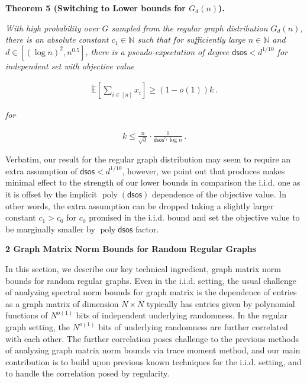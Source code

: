 \documentclass[10pt,a4paper]{article}
\begin{document}


\par\medskip\noindent\textbf{
\textbf{Theorem 5}\textbf{ }(Switching to Lower bounds for $G_{d}(n)$)\textbf{.}
}\par



\emph{With high probability over $G$ sampled from the regular graph distribution $G_{d}(n)$, there is an absolute constant $c_{1}\in\mathbb{N}$ such that for sufficiently large $n\in\mathbb{N}$ and $d\in[(\log n)^{2},n^{0.5}]$, there is a pseudo-expectation of degree $\mathsf{dsos}<d^{1/10}$ for independent set with objective value}\par


\[\begin{gathered}
\widetilde{\mathbb{E}}[\sum_{i\in[n]}x_{i}]\geq(1-o(1))k\,.
\end{gathered}\]


\emph{for}\par


\[\begin{gathered}
k\leq\frac{n}{\sqrt{d}}\cdot\frac{1}{\mathsf{dsos}^{c_{1}}\log n}\,.
\end{gathered}\]






Verbatim, our result for the regular graph distribution may seem to require an extra assumption of $\mathsf{dsos}<d^{1/10}$, however, we point out that produces makes minimal effect to the strength of our lower bounds in comparison the i.i.d. one as it is offset by the implicit $\operatorname{poly}(\mathsf{dsos})$ dependence of the objective value. In other words, the extra assumption can be dropped taking a slightly larger constant $c_{1}>c_{0}$ for $c_{0}$ promised in the i.i.d. bound and set the objective value to be marginally smaller by $\operatorname{poly}\mathsf{dsos}$ factor.\par






\par\medskip\noindent\textbf{
2 Graph Matrix Norm Bounds for Random Regular Graphs}\par




In this section, we describe our key technical ingredient, graph matrix norm bounds for random regular graphs. Even in the i.i.d. setting, the usual challenge of analyzing spectral norm bounds for graph matrix is the dependence of entries as a graph matrix of dimension $N\times N$ typically has entries given by polynomial functions of $N^{o(1)}$ bits of independent underlying randomness. In the regular graph setting, the $N^{o(1)}$ bits of underlying randomness are further correlated with each other. The further correlation poses challenge to the previous methods of analyzing graph matrix norm bounds via trace moment method, and our main contribution is to build upon previous known techniques for the i.i.d. setting, and to handle the correlation posed by regularity.\par
\end{document}
